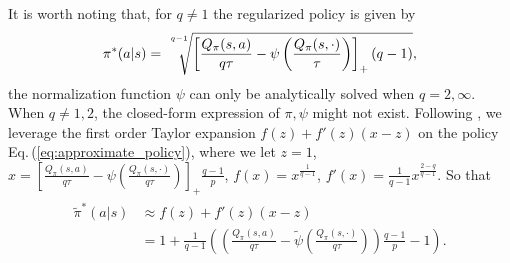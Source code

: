 \documentclass{article}
\newcommand{\AdaBracket}[1]{\left(#1\right)}
\newcommand{\AdaRectBracket}[1]{\left[#1\right]}
\newcommand{\eq}[1]{Eq.\,(#1)}
\begin{document}
It is worth noting that, for $q\neq 1$ the regularized policy is given by 
\begin{align}
    \pi^{*}(a|s) = \sqrt[\leftroot{-2}\uproot{16}q-1]{\AdaRectBracket{\frac{Q_{\pi}(s,a)}{q\tau}  - \psi\AdaBracket{\frac{Q_{\pi}(s,\cdot)}{\tau}} }_{+}  (q-1) },
    \label{eq:approximate_policy}
\end{align}
the normalization function $\psi$ can only be analytically solved when $q=2, \infty$.  
When $q\neq 1,2$, the closed-form expression of $\pi, \psi$ might not exist.
Following \citep{chen2018-TsallisApproximate}, we leverage the first order Taylor expansion $f(z) + f'(z)(x-z)$ on the policy \eq{\ref{eq:approximate_policy}},
where we let $z=1$, $x= \AdaRectBracket{\frac{Q_{\pi}(s,a)}{q\tau}  - \psi\AdaBracket{\frac{Q_{\pi}(s,\cdot)}{q\tau}} }_{+}  \frac{q-1}{p} $,  $f(x) = x^{\frac{1}{q-1}}$, $f'(x) = \frac{1}{q-1}x^\frac{2-q}{q-1}$. So that
\begin{align}
    \begin{split}
        \tilde{\pi}^{*}(a|s) &\approx f(z) + f'(z)(x-z) \\
        & = 1 + \frac{1}{q-1}\AdaBracket{\AdaBracket{\frac{Q_{\pi}(s,a)}{q\tau} - \tilde{\psi}\AdaBracket{\frac{Q_{\pi}(s,\cdot)}{q\tau}} } \frac{q-1}{p}  - 1} .
    \end{split}
    \label{eq:apdx_approximate_policy}
\end{align}
\end{document}
